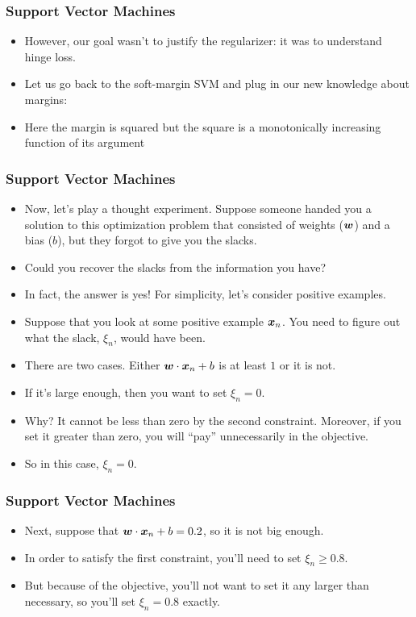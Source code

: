 \documentclass[trans]{beamer}
\begin{document}
\begin{frame}
  \frametitle{Support Vector Machines}
\begin{itemize}
\item 
However, our goal wasn't to justify the regularizer: it was to
understand hinge loss.
\item   Let us go back to the soft-margin SVM and
plug in our new knowledge about margins:
%
%
\item Here the margin is squared but the square is a monotonically increasing function
of its argument
\end{itemize}
\end{frame}
\begin{frame}
  \frametitle{Support Vector Machines}
\begin{itemize}
\item 
Now, let's play a thought experiment.  Suppose someone handed you a
solution to this optimization problem that consisted of weights
(${\boldsymbol{w}}$) and a bias ($b$), but they forgot to give you the slacks.
\item 
Could you recover the slacks from the information you have?
\item
In fact, the answer is yes!  For simplicity, let's consider positive
examples. 
\item  Suppose that you look at some positive example ${\boldsymbol{x}}_n$.
You need to figure out what the slack, $\xi_n$, would have been.
\item 
There are two cases.  Either ${\boldsymbol{w}} \cdot {\boldsymbol{x}}_n+b$ is at least $1$ or
it is not.
\item   If it's large enough, then you want to set $\xi_n = 0$.
\item
Why?  It cannot be less than zero by the second constraint.  Moreover,
if you set it greater than zero, you will ``pay'' unnecessarily in the
objective. 
\item  So in this case, $\xi_n=0$. 
\end{itemize}
\end{frame}
\begin{frame}
  \frametitle{Support Vector Machines}
\begin{itemize}
\item 
 Next, suppose that
${\boldsymbol{w}} \cdot {\boldsymbol{x}}_n+b = 0.2$, so it is not big enough.  
\item In order to
satisfy the first constraint, you'll need to set $\xi_n \geq 0.8$.
\item But because of the objective, you'll not want to set it any larger
than necessary, so you'll set $\xi_n = 0.8$ exactly.
\end{itemize}
\end{frame}
\end{document}

